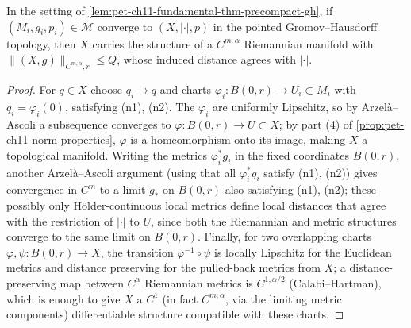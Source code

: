 \begin{lemma}
  \label{lem:pet-ch11-fundamental-thm-limit-is-manifold}
  In the setting of \cref{lem:pet-ch11-fundamental-thm-precompact-gh}, if
  $(M_i,g_i,p_i)\in\mathcal{M}$ converge to $(X,|\cdot|,p)$ in the pointed
  Gromov--Hausdorff topology, then $X$ carries the structure of a $C^{m,\alpha}$
  Riemannian manifold with $\|(X,g)\|_{C^{m,\alpha},r}\le Q$, whose induced
  distance agrees with $|\cdot|$.
\end{lemma}
\begin{proof}
  For $q\in X$ choose $q_i\to q$ and charts $\varphi_i:B(0,r)\to U_i\subset M_i$
  with $q_i=\varphi_i(0)$, satisfying (n1), (n2). The $\varphi_i$ are
  uniformly Lipschitz, so by Arzelà--Ascoli a subsequence converges to
  $\varphi:B(0,r)\to U\subset X$; by part (4) of
  \cref{prop:pet-ch11-norm-properties}, $\varphi$ is a homeomorphism onto its
  image, making $X$ a topological manifold. Writing the metrics
  $\varphi_i^*g_i$ in the fixed coordinates $B(0,r)$, another Arzelà--Ascoli
  argument (using that all $\varphi_i^*g_i$ satisfy (n1), (n2)) gives
  convergence in $C^m$ to a limit $g_*$ on $B(0,r)$ also satisfying (n1),
  (n2); these possibly only Hölder-continuous local metrics define local
  distances that agree with the restriction of $|\cdot|$ to $U$, since both
  the Riemannian and metric structures converge to the same limit on
  $B(0,r)$. Finally, for two overlapping charts $\varphi,\psi:B(0,r)\to X$,
  the transition $\varphi^{-1}\circ\psi$ is locally Lipschitz for the
  Euclidean metrics and distance preserving for the pulled-back metrics from
  $X$; a distance-preserving map between $C^\alpha$ Riemannian metrics is
  $C^{1,\alpha/2}$ (Calabi--Hartman), which is enough to give $X$ a
  $C^{1}$ (in fact $C^{m,\alpha}$, via the limiting metric components)
  differentiable structure compatible with these charts.
\end{proof}

